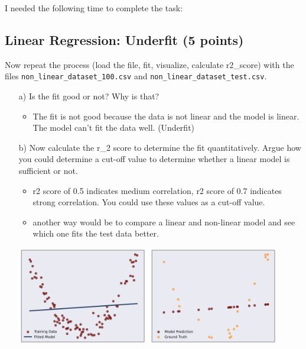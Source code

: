 \documentclass{article}
\begin{document}
\begin{enumerate}
\end{enumerate}

I needed the following time to complete the task:

\subsection{Linear Regression: Underfit (5 points)}

Now repeat the process (load the file, fit, visualize, calculate r2\_score) with the files \texttt{non\_linear\_dataset\_100.csv} and \texttt{non\_linear\_dataset\_test.csv}.

\begin{enumerate}

\item[a)] Is the fit good or not? Why is that? 
\begin{itemize}
	\item The fit is not good because the data is not linear and the model is linear. The model can't fit the data well. (Underfit)
\end{itemize}

\item[b)] Now calculate the r\_2 score to determine the fit quantitatively. Argue how you could determine a cut-off value to determine whether a linear model is sufficient or not.
\begin{itemize}
	\item r2 score of 0.5 indicates medium correlation, r2 score of 0.7 indicates strong correlation. You could use these values as a cut-off value.
	\item another way would be to compare a linear and non-linear model and see which one fits the test data better.
\end{itemize}


\includegraphics[width=0.45\textwidth]{source_code/underfit_linear_model.png}
\includegraphics[width=0.45\textwidth]{source_code/underfit_linear_testdata.png}

\end{enumerate}
\end{document}
